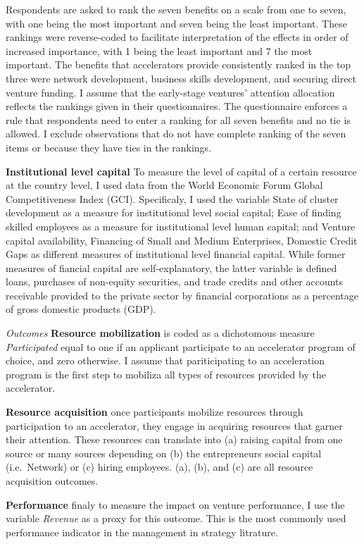 \documentclass[
  english,
  man]{apa6}
\begin{document}
Respondents are asked to rank the seven benefits on a scale from one to seven, with one being the most important and seven being the least important. These rankings were reverse-coded to facilitate interpretation of the effects in order of increased importance, with 1 being the least important and 7 the most important. The benefits that accelerators provide consistently ranked in the top three were network development, business skills development, and securing direct venture funding. I assume that the early-stage ventures' attention allocation reflects the rankings given in their questionnaires. The questionnaire enforces a rule that respondents need to enter a ranking for all seven benefits and no tie is allowed. I exclude observations that do not have complete ranking of the seven items or because they have ties in the rankings.

\textbf{Institutional level capital} To measure the level of capital of a certain resource at the country level, I used data from the World Economic Forum Global Competitiveness Index (GCI). Specificaly, I used the variable State of cluster development as a measure for institutional level social capital; Ease of finding skilled employees as a measure for institutional level human capital; and Venture capital availability, Financing of Small and Medium Enterprises, Domestic Credit Gaps as different measures of institutional level financial capital. While former measures of fiancial capital are self-explanatory, the latter variable is defined loans, purchases of non-equity securities, and trade credits and other accounts receivable provided to the private sector by financial corporations as a percentage of gross domestic products (GDP).

\emph{Outcomes}
\textbf{Resource mobilization} is coded as a dichotomous measure \emph{Participated} equal to one
if an applicant participate to an accelerator program of choice, and zero otherwise. I assume that pariticipating to an acceleration program is the first step to mobiliza all types of resources provided by the accelerator.

\textbf{Resource acquisition} once participants mobilize resources through participation to an accelerator, they engage in acquiring resources that garner their attention. These resources can translate into (a) raising capital from one source or many sources depending on (b) the entrepreneurs social capital (i.e.~Network) or (c) hiring employees. (a), (b), and (c) are all resource acquisition outcomes.

\textbf{Performance} finaly to measure the impact on venture performance, I use the variable \emph{Revenue} as a proxy for this outcome. This is the most commonly used performance indicator in the management in strategy litrature.
\end{document}
